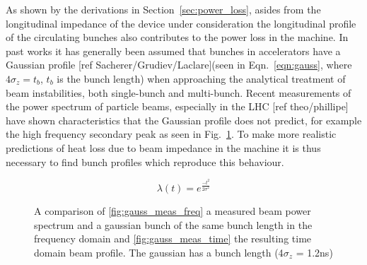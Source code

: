 \documentclass[12pt,a4paper,twopage,openright]{report}
\begin{document}
As shown by the derivations in Section~\ref{sec:power_loss}, asides from the longitudinal impedance of the device under consideration the longitudinal profile of the circulating bunches also contributes to the power loss in the machine. In past works it has generally been assumed that bunches in accelerators have a Gaussian profile [ref Sacherer/Grudiev/Laclare](seen in Eqn.~\ref{eqn:gauss}, where $4\sigma_{z} = t_{b}$, $t_{b}$ is the bunch length) when approaching the analytical treatment of beam instabilities, both single-bunch and multi-bunch. Recent measurements of the power spectrum of particle beams, especially in the LHC [ref theo/phillipe] have shown characteristics that the Gaussian profile does not predict, for example the high frequency secondary peak as seen in Fig.~\ref{fig:measured_gauss}. To make more realistic predictions of heat loss due to beam impedance in the machine it is thus necessary to find bunch profiles which reproduce this behaviour.

\begin{equation}
\lambda \left( t \right) = e^{\frac{-t^{2}}{2\sigma^{2}}}
\label{eqn:gauss}
\end{equation}

\begin{figure}
\caption{A comparison of \ref{fig:gauss_meas_freq} a measured beam power spectrum and a gaussian bunch of the same bunch length in the frequency domain and \ref{fig:gauss_meas_time} the resulting time domain beam profile. The gaussian has a bunch length (4$\sigma_{z}$ = 1.2ns) }
\label{fig:measured_gauss}
\end{figure}
\end{document}
